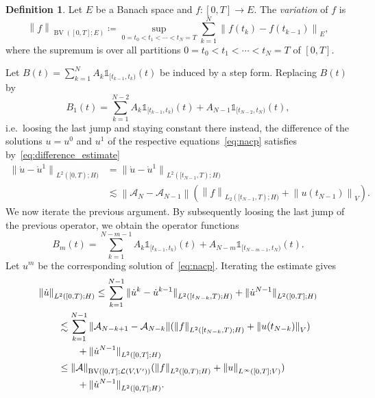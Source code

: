 \documentclass[reqno,a4paper,final]{amsart}
\numberwithin{equation}{section}
\theoremstyle{definition}
\newtheorem{definition}[lemma]{Definition}
\begin{document}
	\begin{definition}
		Let $E$ be a Banach space and $f\colon [0,T] \to E$. The \emph{variation} of $f$ is
			\begin{equation*}
				{\left\lVert{f}\right\rVert}_{\operatorname{BV}([0,T]; E)} \coloneqq \sup_{0 = t_0 < t_1 < \cdots < t_N = T} \sum_{k=1}^N {\left\lVert{f(t_k) - f(t_{k-1})}\right\rVert}_{E},
			\end{equation*}
		where the supremum is over all partitions $0 = t_0 < t_1 < \cdots < t_N = T$ of $[0,T]$.
	\end{definition}
	
	Let $B(t) = \sum_{k=1}^N A_k \mathds{1}_{[t_{k-1}, t_k)}(t)$ be induced by a step form. Replacing $B(t)$ by 
	\begin{equation*}
		B_1(t) = \sum_{k=1}^{N-2} A_k \mathds{1}_{[t_{k-1}, t_k)}(t) + A_{N-1} \mathds{1}_{[t_{N-2}, t_N)}(t),
	\end{equation*}
	i.e.\ loosing the last jump and staying constant there instead, the difference of the solutions $u = u^0$ and $u^1$ of the respective equations~\eqref{eq:nacp} satisfies by~\eqref{eq:difference_estimate}
	\begin{align*}
		{\lVert{\dot{u} - \dot{u}^1}\rVert}_{L^2([0,T);H)} & = {\lVert{\dot{u} - \dot{u}^1}\rVert}_{L^2([t_{N-1}, T);H)} \\
		& \lesssim {\left\lVert{\mathcal{A}_N - \mathcal{A}_{N-1}}\right\rVert} ( {\left\lVert{f}\right\rVert}_{L_2([t_{N-1}, T);H)} + {\left\lVert{u(t_{N-1})}\right\rVert}_V ).
	\end{align*}
	We now iterate the previous argument. By subsequently loosing the last jump of the previous operator, we obtain the operator functions
	\begin{equation*}
	 	B_m(t) = \sum_{k = 1}^{N - m - 1} A_k \mathds{1}_{[t_{k-1}, t_k)}(t) + A_{N - m} \mathds{1}_{[t_{N - m - 1}, t_{N})}(t).
	\end{equation*} 
	Let $u^m$ be the corresponding solution of~\eqref{eq:nacp}. Iterating the estimate gives
	\begin{equation}
		\label{eq:derivative}
		\begin{split}
    		\MoveEqLeft {\lVert{\dot{u}}\rVert}_{L^2([0,T);H)} \le \sum_{k=1}^{N-1} {\lVert{\dot{u}^k - \dot{u}^{k-1}}\rVert}_{L^2([t_{N-k},T);H)} + {\lVert{\dot{u}^{N-1}}\rVert}_{L^2([0,T];H)} \\
    		& \lesssim \sum_{k=1}^{N-1} {\left\lVert{\mathcal{A}_{N-k+1} - \mathcal{A}_{N-k}}\right\rVert} ({\left\lVert{f}\right\rVert}_{L^2([t_{N-k},T);H)} + {\left\lVert{u(t_{N-k})}\right\rVert}_V) \\
			& \qquad + {\lVert{\dot{u}^{N-1}}\rVert}_{L^2([0,T];H)} \\
    		& \le {\left\lVert{\mathcal{A}}\right\rVert}_{\operatorname{BV}([0,T];\mathcal{L}(V,V'))} ({\left\lVert{f}\right\rVert}_{L^2([0,T);H)} + {\left\lVert{u}\right\rVert}_{L^{\infty}([0,T];V)}) \\
			& \qquad + {\lVert{\dot{u}^{N-1}}\rVert}_{L^2([0,T];H)}.
		\end{split}
	\end{equation}
\end{document}
